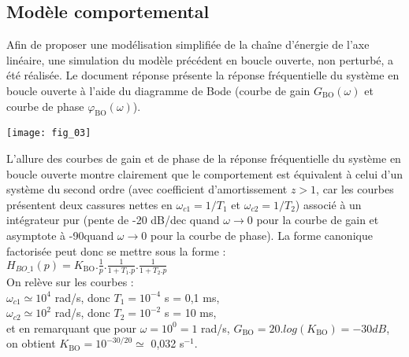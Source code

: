 \begin{multicols}{2}
\subsection*{Modèle comportemental}

\ifprof
\else
Afin de proposer une modélisation simplifiée de la chaîne d'énergie de l'axe linéaire, une simulation du modèle précédent en boucle ouverte, non perturbé, a été réalisée. Le document réponse présente la réponse fréquentielle du système en boucle ouverte à l'aide du diagramme de Bode (courbe de gain $G_{\text{BO}}(\omega)$ et courbe de phase $\varphi_{\text{BO}}(\omega)$). 


\fi




\begin{center}
\texttt{[image: fig\_03]}
\end{center}


\ifprof
\begin{corrige}
L'allure des courbes de gain et de phase de la réponse fréquentielle du système en boucle ouverte montre clairement que le comportement est équivalent à celui d'un système du second ordre (avec coefficient d'amortissement $z>1$, car les courbes présentent deux cassures nettes en $\omega_{c1}=1/T_1$ et $\omega_{c2}=1/T_2$) associé à un intégrateur pur (pente de -20 dB/dec quand $\omega \rightarrow 0$ pour la courbe de gain et asymptote à -90\degre quand $\omega \rightarrow 0$ pour la courbe de phase). La forme canonique factorisée peut donc se mettre sous la forme : \\
$H_{BO\_1}(p) = K_{\text{BO}} . \frac{1}{p}. \frac{1}{1+T_1.p} . \frac{1}{1+T_2.p} $\\
On relève sur les courbes :\\
$\omega_{c1} \simeq 10^4$ rad/s, donc $T_1 = 10^{-4}$ s = 0,1 ms,\\
$\omega_{c2} \simeq 10^2$ rad/s, donc $T_2 = 10^{-2}$ s = 10 ms,\\
et en remarquant que pour $\omega = 10^0=1$ rad/s, $G_{\text{BO}}=20.log(K_{\text{BO}})= -30 dB$, on obtient $ K_{\text{BO}} = 10^{-30/20} \simeq $ 0,032 s$^{-1}$.
 \end{corrige}
\fi



\end{multicols}

